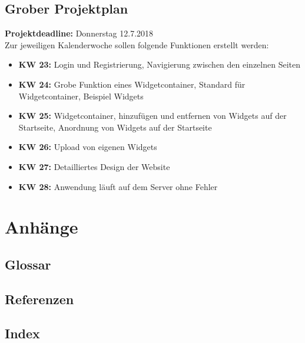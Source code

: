 	\subsection{Grober Projektplan}
		\textbf{Projektdeadline: } Donnerstag 12.7.2018 \\
		Zur jeweiligen Kalenderwoche sollen folgende Funktionen erstellt werden: 
		\begin{itemize}
			\item \textbf{KW 23: }Login und Registrierung, Navigierung zwischen den einzelnen Seiten 
			\item \textbf{KW 24: }Grobe Funktion eines Widgetcontainer, Standard für Widgetcontainer, Beispiel Widgets  
			\item \textbf{KW 25: }Widgetcontainer, hinzufügen und entfernen von Widgets auf der Startseite, Anordnung von Widgets auf der Startseite   
			\item \textbf{KW 26: }Upload von eigenen Widgets
			\item \textbf{KW 27: }Detailliertes Design der Website 
			\item \textbf{KW 28: }Anwendung läuft auf dem Server ohne Fehler
		\end{itemize}
		
		
	

\section{Anhänge}

	\subsection{Glossar}
	
	\subsection{Referenzen}
	
	\subsection{Index}
